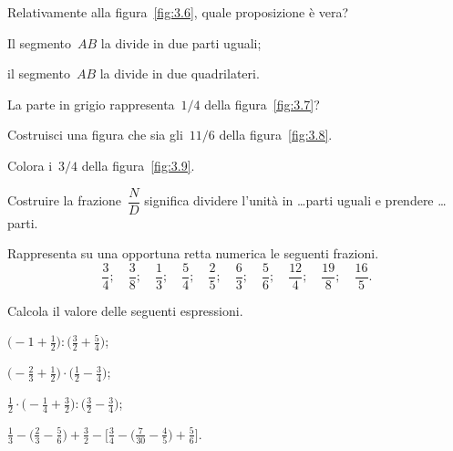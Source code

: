 \begin{esercizio}
\label{ese:3.137}
Relativamente alla figura~\ref{fig:3.6}, quale proposizione è vera?

\begin{enumeratea}
\item Il segmento~$AB$ la divide in due parti uguali;
\item il segmento~$AB$ la divide in due quadrilateri.
\end{enumeratea}
\end{esercizio}

 \begin{esercizio}
 \label{ese:3.138}
La parte in grigio rappresenta~$1/4$ della figura~\ref{fig:3.7}?
\end{esercizio}

\begin{esercizio}
\label{ese:3.139}
 Costruisci una figura che sia gli~$11/6$ della figura~\ref{fig:3.8}.
\end{esercizio}

\begin{esercizio}
\label{ese:3.140}
Colora i~$3/4$ della figura~\ref{fig:3.9}.
\end{esercizio}

\begin{esercizio}
Costruire la frazione~$\dfrac{N}{D}$ significa dividere l’unità in \ldots parti uguali e prendere \ldots parti.
\end{esercizio}

\begin{esercizio}
Rappresenta su una opportuna retta numerica le seguenti frazioni.
\[\frac{3}{4};\quad\frac{3}{8};\quad\frac{1}{3};\quad\frac{5}{4};\quad\frac{2}{5};\quad\frac{6}{3};\quad\frac{5}{6};\quad%
\frac{12}{4};\quad\frac{19}{8};\quad\frac{16}{5}.\]
\end{esercizio}

\begin{esercizio}[\Ast]
 Calcola il valore delle seguenti espressioni.
\begin{enumeratea}
\spazielenx
\item $\displaystyle{\bigg(-1+\frac{1}{2}\bigg):\bigg(\frac{3}{2}+\frac{5}{4}\bigg)}$;
\item $\displaystyle{\bigg(-{\frac{2}{3}}+\frac{1}{2}\bigg)\cdot\bigg(\frac{1}{2}-\frac{3}{4}\bigg)}$;
\item $\displaystyle{\frac{1}{2}\cdot\bigg(-{\frac{1}{4}}+\frac{3}{2}\bigg):\bigg(\frac{3}{2}-\frac{3}{4}\bigg)}$;
\item $\displaystyle{\frac{1}{3}-\bigg(\frac{2}{3}-\frac{5}{6}\bigg)+\frac{3}{2}-\bigg[\frac{3}{4}-\bigg(\frac{7}{30}%
-\frac{4}{5}\bigg)+\frac{5}{6}\bigg]}$.
\end{enumeratea}
\end{esercizio}

